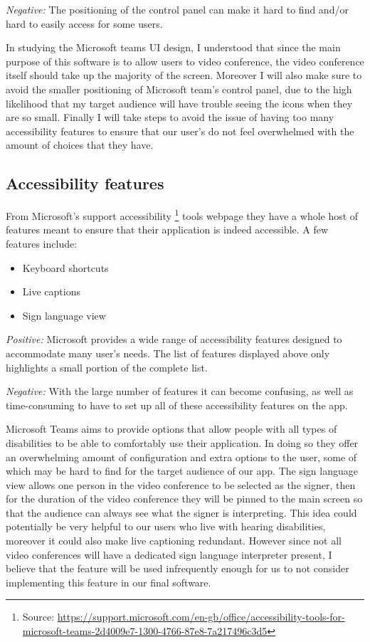 \textit{Negative:} The positioning of the control panel can
make it hard to find and/or hard to easily access for some users.\\ \vspace{0.2cm}

In studying the Microsoft teams UI design, I understood that
since the main purpose of this software is to allow users to
video conference, the video conference itself should take up
the majority of the screen. Moreover I will also make sure to
avoid the smaller positioning of Microsoft team's control
panel, due to the high likelihood that my target audience
will have trouble seeing the icons when they are so small.
Finally I will take steps to avoid the issue of having too
many accessibility features to ensure that our user's do not
feel overwhelmed with the amount of choices that they have.

\subsection*{Accessibility features}

From Microsoft's support accessibility
\footnote{Source:
\url{https://support.microsoft.com/en-gb/office/accessibility-tools-for-microsoft-teams-2d4009e7-1300-4766-87e8-7a217496c3d5}}
tools webpage they have a whole host of features meant
to ensure that their application is indeed accessible.
A few features include:

\begin{itemize}
  \item Keyboard shortcuts
  \item Live captions
  \item Sign language view
\end{itemize}

\textit{Positive:}
Microsoft provides a wide range of accessibility features
designed to accommodate many user's needs. The list of
features displayed above only highlights a small portion of
the complete list.
\vspace{0.2cm}

\textit{Negative:}
With the large number of features it can become confusing,
as well as time-consuming to have to set up all of these
accessibility features on the app.
\vspace{0.2cm}

Microsoft Teams aims to provide options that allow people
with all types of disabilities to be able to comfortably
use their application. In doing so they offer an overwhelming
amount of configuration and extra options to the user, some
of which may be hard to find for the target audience of our
app. The sign language view allows one person in the video
conference to be selected as the signer, then for the
duration of the video conference they will be pinned to the
main screen so that the audience can always see what the
signer is interpreting. This idea could potentially be very
helpful to our users who live with hearing disabilities,
moreover it could also make live captioning redundant.
However since not all video conferences will have a dedicated
sign language interpreter present, I believe that the feature
will be used infrequently enough for us to not consider
implementing this feature in our final software.

